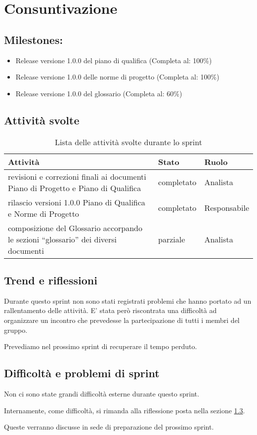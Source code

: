 \section{Consuntivazione}

\subsection{Milestones:}
\begin{itemize}
    \item Release versione 1.0.0 del piano di qualifica (Completa al: 100\%)
    \item Release versione 1.0.0 delle norme di progetto (Completa al: 100\%)
    \item Release versione 1.0.0 del glossario (Completa al: 60\%)
\end{itemize}

\subsection{Attività svolte}

\begin{table}[H]
    \begin{xltabular}{\textwidth}{X l l}
        
         \textbf{Attività} & \textbf{Stato} & \textbf{Ruolo}\\
        \endhead
        \hline
        revisioni e correzioni finali ai documenti Piano di Progetto e Piano di Qualifica & completato & Analista \\
        rilascio versioni 1.0.0 Piano di Qualifica e Norme di Progetto & completato & Responsabile \\
        composizione del Glossario accorpando le sezioni “glossario” dei diversi documenti & parziale & Analista \\
    \end{xltabular}
    \caption{Lista delle attività svolte durante lo sprint}
\end{table}

\subsection{Trend e riflessioni}\label{subsec:trend}

Durante questo sprint non sono stati registrati problemi che hanno portato ad un rallentamento delle attività. E' stata però riscontrata una difficoltà ad organizzare un incontro che prevedesse la partecipazione di tutti i membri del gruppo.

Prevediamo nel prossimo sprint di recuperare il tempo perduto.

\subsection{Difficoltà e problemi di sprint}

Non ci sono state grandi difficoltà esterne durante questo sprint.

Internamente, come difficoltà, si rimanda alla riflessione posta nella sezione \ref{subsec:trend}.

Queste verranno discusse in sede di preparazione del prossimo sprint.
